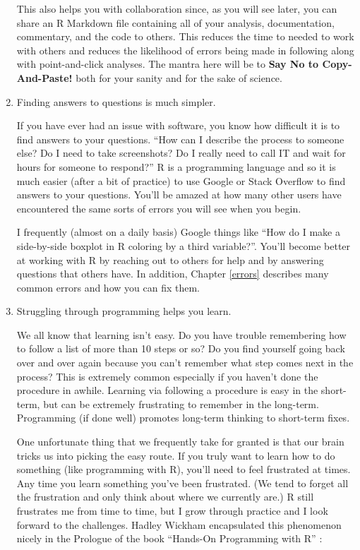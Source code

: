 \documentclass[]{tufte-book}
\theoremstyle{definition}
\theoremstyle{definition}
\theoremstyle{remark}
\begin{document}
\begin{enumerate}
  This also helps you with collaboration since, as you will see later,
  you can share an R Markdown file containing all of your analysis,
  documentation, commentary, and the code to others. This reduces the
  time to needed to work with others and reduces the likelihood of
  errors being made in following along with point-and-click analyses.
  The mantra here will be to \textbf{Say No to Copy-And-Paste!} both for
  your sanity and for the sake of science.
\item
  Finding answers to questions is much simpler.

  If you have ever had an issue with software, you know how difficult it
  is to find answers to your questions. ``How can I describe the process
  to someone else? Do I need to take screenshots? Do I really need to
  call IT and wait for hours for someone to respond?'' R is a
  programming language and so it is much easier (after a bit of
  practice) to use Google or Stack Overflow to find answers to your
  questions. You'll be amazed at how many other users have encountered
  the same sorts of errors you will see when you begin.

  I frequently (almost on a daily basis) Google things like ``How do I
  make a side-by-side boxplot in R coloring by a third variable?''.
  You'll become better at working with R by reaching out to others for
  help and by answering questions that others have. In addition, Chapter
  \ref{errors} describes many common errors and how you can fix them.
\item
  Struggling through programming helps you learn.

  We all know that learning isn't easy. Do you have trouble remembering
  how to follow a list of more than 10 steps or so? Do you find yourself
  going back over and over again because you can't remember what step
  comes next in the process? This is extremely common especially if you
  haven't done the procedure in awhile. Learning via following a
  procedure is easy in the short-term, but can be extremely frustrating
  to remember in the long-term. Programming (if done well) promotes
  long-term thinking to short-term fixes.

  One unfortunate thing that we frequently take for granted is that our
  brain tricks us into picking the easy route. If you truly want to
  learn how to do something (like programming with R), you'll need to
  feel frustrated at times. Any time you learn something you've been
  frustrated. (We tend to forget all the frustration and only think
  about where we currently are.) R still frustrates me from time to
  time, but I grow through practice and I look forward to the
  challenges. Hadley Wickham encapsulated this phenomenon nicely in the
  Prologue of the book ``Hands-On Programming with R''
  \citep{handson2014}:


\end{enumerate}
\end{document}
